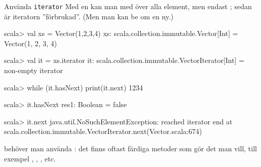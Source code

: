 \begin{Slide}{Använda \texttt{iterator}}\SlideFontSmall
Med en  kan man  med  över alla element, men endast ; sedan är iteratorn ''förbrukad''. (Men man kan be om en ny.)
\begin{REPL}
scala> val xs = Vector(1,2,3,4)
xs: scala.collection.immutable.Vector[Int] = Vector(1, 2, 3, 4)

scala> val it = xs.iterator
it: scala.collection.immutable.VectorIterator[Int] = non-empty iterator

scala> while (it.hasNext) print(it.next)
1234

scala> it.hasNext
res1: Boolean = false

scala> it.next
java.util.NoSuchElementException: reached iterator end
  at scala.collection.immutable.VectorIterator.next(Vector.scala:674)
\end{REPL}
 behöver man  använda : det finns oftast färdiga metoder som gör det man vill, till exempel , , ,  etc.
\end{Slide}

